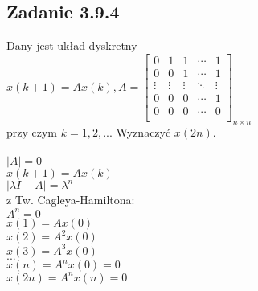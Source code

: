 \subsection*{Zadanie 3.9.4} {\color{darkgray}
	Dany jest układ dyskretny\\
	$x(k+1)=Ax(k), A=\left[ \begin{array}{ccccc}   
		 0&1&1&\cdots&1 \\
		 0&0&1&\cdots&1  \\
		 \vdots&\vdots&\vdots&\ddots&\vdots  \\
		 0&0&0&\cdots&1  \\
		 0&0&0&\cdots&0  \\
	\end{array}\right]_{n \times n}$\\
	przy czym $k=1,2,...$ Wyznaczyć $x(2n)$.
}\\\\
$|A|=0$\\
$x(k+1)=Ax(k)$\\
$|\lambda I -A|=\lambda^n$\\
z Tw. Cagleya-Hamiltona:\\
$A^n=0$\\
$x(1)=Ax(0)$\\
$x(2)=A^2x(0)$\\
$x(3)=A^3x(0)$\\
$...$\\
$x(n)=A^nx(0)=0$\\
$x(2n)=A^nx(n)=0$\\